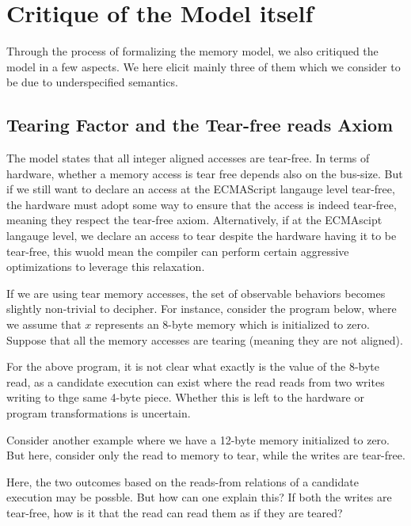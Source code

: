 \section{Critique of the Model itself}

    Through the process of formalizing the memory model, we also critiqued the model in a few aspects. 
    We here elicit mainly three of them which we consider to be due to underspecified semantics.

    \subsection{Tearing Factor and the Tear-free reads Axiom}

        The model states that all integer aligned accesses are tear-free.  
        In terms of hardware, whether a memory access is tear free depends also on the bus-size.
        But if we still want to declare an access at the ECMAScript langauge level tear-free, the hardware must adopt some way to ensure that the access is indeed tear-free, meaning they respect the tear-free axiom.
        Alternatively, if at the ECMAscipt langauge level, we declare an access to tear despite the hardware having it to be tear-free, this wuold mean the compiler can perform certain aggressive optimizations to leverage this relaxation. 

        If we are using tear memory accesses, the set of observable behaviors becomes slightly non-trivial to decipher.
        For instance, consider the program below, where we assume that $x$ represents an 8-byte memory which is initialized to zero. 
        Suppose that all the memory accesses are tearing (meaning they are not aligned).
        


        For the above program, it is not clear what exactly is the value of the 8-byte read, as a candidate execution can exist where the read reads from two writes writing to thge same 4-byte piece.
        Whether this is left to the hardware or program transformations is uncertain. 

        Consider another example where we have a 12-byte memory initialized to zero. 
        But here, consider only the read to memory to tear, while the writes are tear-free.


        Here, the two outcomes based on the reads-from relations of a candidate execution may be possble. 
        But how can one explain this? 
        If both the writes are tear-free, how is it that the read can read them as if they are teared?
       
